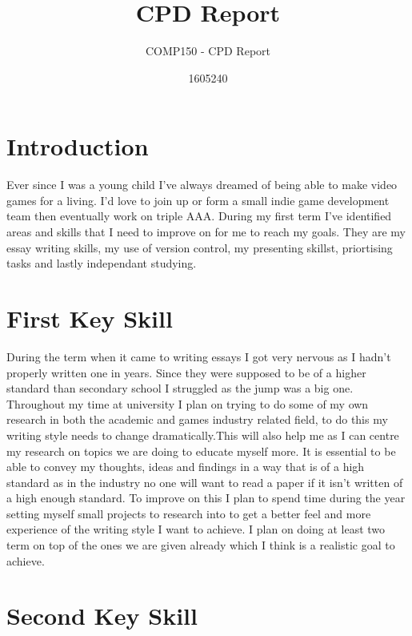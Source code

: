 \documentclass{scrartcl}
\title{CPD Report}
\subtitle{COMP150 - CPD Report}
\author{1605240}
\begin{document}
\maketitle

\section{Introduction}
Ever since I was a young child I've always dreamed of being able to make video games for a living. I'd love to join up or form a small indie game development team then eventually work on triple AAA. During my first term I've identified areas and skills that I need to improve on for me to reach my goals. They are my essay writing skills, my use of version control, my presenting skillst, priortising tasks and lastly independant studying.

\section{First Key Skill}
During the term when it came to writing essays I got very nervous as I hadn't properly written one in years. Since they were supposed to be of a higher standard than secondary school I struggled as the jump was a big one. Throughout my time at university I plan on trying to do some of my own research in both the academic and games industry related field, to do this my writing style needs to change dramatically.This will also help me as I can centre my research on topics we are doing to educate myself more.  It is essential to be able to convey my thoughts, ideas and findings in a way that is of a high standard as in the industry no one will want to read a paper if it isn't written of a high enough standard. To improve on this I plan to spend time during the year setting myself small projects to research into to get a better feel and more experience of the writing style I want to achieve. I plan on doing at least two term on top of the ones we are given already which I think is a realistic goal to achieve.


\section{Second Key Skill}
\end{document}

